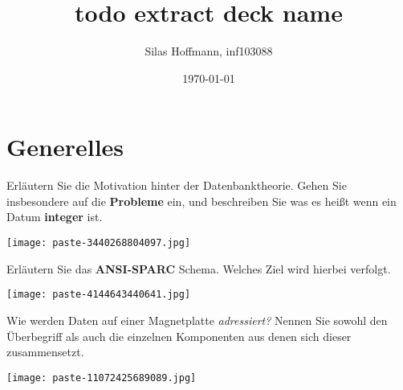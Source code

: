 \documentclass{article}
\title{todo extract deck name}
\author{Silas Hoffmann, inf103088}
\date{\today}
\begin{document}
\maketitle
\clearpage
\tableofcontents
\clearpage

\section{Generelles}
\begin{tcolorbox}[colback=white!10!white,colframe=lightgray!75!black,
  savelowerto=\jobname_ex.tex,breakable,enhanced,lines before break=50]

\begin{center}
 Erläutern Sie die Motivation hinter der Datenbanktheorie. Gehen Sie insbesondere auf die 
\textbf{Probleme
} ein, und beschreiben Sie was es heißt wenn ein Datum 
\textbf{integer
}ist. 

\end{center}

\tcblower

\justifying
\texttt{[image: paste-3440268804097.jpg]}

\end{tcolorbox}
\begin{tcolorbox}[colback=white!10!white,colframe=lightgray!75!black,
  savelowerto=\jobname_ex.tex,breakable,enhanced,lines before break=50]

\begin{center}
 Erläutern Sie das 
\textbf{ANSI-SPARC
}Schema. Welches Ziel wird hierbei verfolgt. 

\end{center}

\tcblower

\justifying
\texttt{[image: paste-4144643440641.jpg]}

\end{tcolorbox}
\begin{tcolorbox}[colback=white!10!white,colframe=lightgray!75!black,
  savelowerto=\jobname_ex.tex,breakable,enhanced,lines before break=50]

\begin{center}
 Wie werden Daten auf einer Magnetplatte 
\textit{adressiert?
}Nennen Sie sowohl den Überbegriff als auch die einzelnen Komponenten aus denen sich dieser zusammensetzt. 

\end{center}

\tcblower

\justifying
\texttt{[image: paste-11072425689089.jpg]}

\end{tcolorbox}
\end{document}
